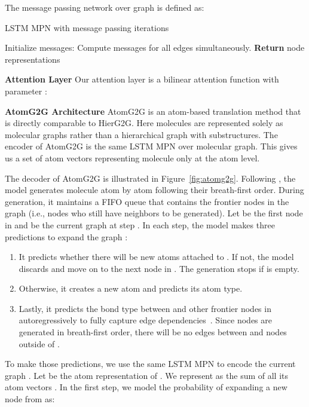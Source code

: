 \documentclass{article} \usepackage{iclr2020_conference,times}
\begin{document}
The message passing network  over graph  is defined as:
\begin{algorithm}
\caption{LSTM MPN with  message passing iterations}
\begin{algorithmic}
\FUNCTION{}
\STATE Initialize messages: 
\STATE Compute messages  for all edges  simultaneously.
\ENDFOR
\STATE \textbf{Return } node representations 
\vspace{3pt}
\ENDFUNCTION
\end{algorithmic}
\end{algorithm}

\textbf{Attention Layer } Our attention layer is a bilinear attention function with parameter :


\textbf{AtomG2G Architecture } AtomG2G is an atom-based translation method that is directly comparable to HierG2G. Here molecules are represented solely as molecular graphs rather than a hierarchical graph with substructures. The encoder of AtomG2G is the same LSTM MPN over molecular graph. This gives us a set of atom vectors  representing molecule  only at the atom level.

The decoder of AtomG2G is illustrated in Figure~\ref{fig:atomg2g}. Following \citet{you2018graphrnn,liu2018constrained}, the model generates molecule  atom by atom following their breath-first order. During generation, it maintains a FIFO queue  that contains the frontier nodes in the graph (i.e., nodes who still have neighbors to be generated). 
Let  be the first node in  and  be the current graph at step . In each step, the model makes three predictions to expand the graph :
\begin{enumerate}[leftmargin=*,topsep=0pt,itemsep=0pt]
\item It predicts whether there will be new atoms attached to . If not, the model discards  and move on to the next node in . The generation stops if  is empty.
\item Otherwise, it creates a new atom  and predicts its atom type.
\item Lastly, it predicts the bond type between  and other frontier nodes in  autoregressively to fully capture edge dependencies~\citep{you2018graphrnn}. Since nodes are generated in breath-first order, there will be no edges between  and nodes outside of .
\end{enumerate}

To make those predictions, we use the same LSTM MPN to encode the current graph . Let  be the atom representation of . We represent  as the sum of all its atom vectors . In the first step, we model the probability of expanding a new node from  as:
\end{document}
